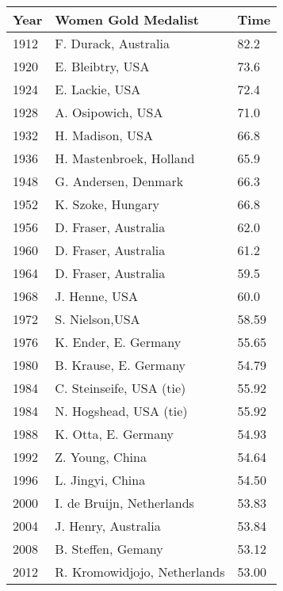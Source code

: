 \documentclass[a4paper, 11pt]{article}
\begin{document}
\begin{multicols}{2}
\columnbreak
\begin{tabular}{ | l | l | l |}
    \hline
    Year    &     Women Gold Medalist         & Time\\
    \hline
    1912    &    F. Durack, Australia          &    82.2 \\
    1920    &    E. Bleibtry, USA               &    73.6 \\
    1924    &    E. Lackie, USA                 &    72.4 \\
    1928    &    A. Osipowich, USA              &    71.0 \\
    1932    &    H. Madison, USA                &    66.8 \\
    1936    &    H. Mastenbroek, Holland        &    65.9 \\
    1948    &    G. Andersen, Denmark           &    66.3 \\
    1952    &    K. Szoke, Hungary              &    66.8 \\
    1956    &    D. Fraser, Australia           &    62.0 \\
    1960    &    D. Fraser, Australia           &    61.2 \\
    1964    &    D. Fraser, Australia           &    59.5 \\
    1968    &    J. Henne, USA                  &    60.0 \\
    1972    &    S. Nielson,USA                 &    58.59 \\
    1976    &    K. Ender, E. Germany           &    55.65 \\
    1980    &    B. Krause, E. Germany          &    54.79 \\
    1984    &    C. Steinseife, USA (tie)       &    55.92 \\
    1984    &    N. Hogshead, USA (tie)         &    55.92 \\
    1988    &    K. Otta, E. Germany            &    54.93 \\
    1992    &    Z. Young, China                &    54.64 \\
    1996    &    L. Jingyi, China               &    54.50 \\
		2000    &    I. de Bruijn, Netherlands      &    53.83 \\
		2004		& 	 J. Henry, Australia            &   53.84 \\
		2008 		& 	 B. Steffen, Gemany		        	&   53.12 \\
		2012		&	 R. Kromowidjojo, Netherlands			&   53.00 \\
    \hline
    \end{tabular}
\end{multicols}
\end{document}
